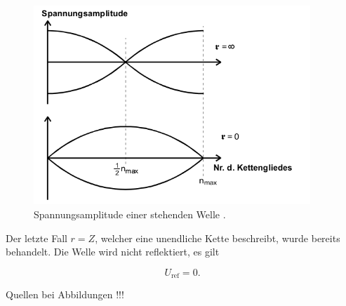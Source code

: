 \begin{figure}
  \centering
  \includegraphics[height = 7.5cm]{Reflexion.png}
  \caption{Spannungsamplitude einer stehenden Welle \cite{anleitung}.}
  \label{fig:BauchKnot}
\end{figure}

Der letzte Fall $r=Z$, welcher eine unendliche Kette beschreibt, wurde bereits
behandelt. Die Welle wird nicht reflektiert, es gilt

\begin{equation}
  U_\text{ref} = 0.
\end{equation}

Quellen bei Abbildungen !!!

\cite{sample}

